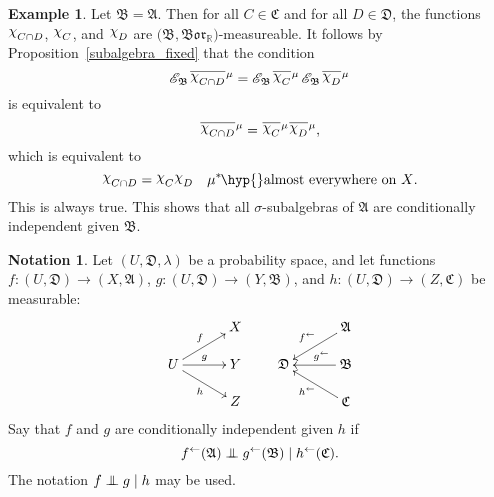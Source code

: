 \documentclass[
twoside=true,
paper=letter,
fontsize=9pt,
pagesize=auto,
leqno,
openany,
headsepline,
overfullrule,
]{scrbook}
\theoremstyle{plain}
\theoremstyle{plain}
\theoremstyle{definition}
\newtheorem{example}[thm]{Example}
\newtheorem{notn}[thm]{Notation}
\theoremstyle{bfnoteitalic}
\theoremstyle{bfnoteroman}
\newcommand{\sigalg}[1]{\mathfrak{#1}}
\newcommand{\cali}[1]{\mathscr{#1}}
\newcommand{\condexpsub}[2]
{\mathop{\cali{E}\hspace{-1.5pt}}\nolimits_{#2}\hspace{-1pt}#1}
\newcommand{\borel}{\mathfrak{Bor}}
\newcommand{\textsigma}{\hbox{\large{$\sigma$}}\kern-1pt}
\newcommand{\charfunction}[1]{{\raisebox{2pt}{$\chi$}}_{#1}}
\newcommand{\preimage}[1]{#1^{\leftarrow}}
\newcommand{\R}{\mathbb{R}}
\newcommand{\meets}{\cap}
\newcommand{\sigmaalgebra}{\sigalg{A}}
\newcommand{\sigmaalgebraii}{\sigalg{B}}
\newcommand{\sigmaalgebraiii}{\sigalg{C}}
\newcommand{\sigmaalgebraiv}{\sigalg{D}}
\newcommand{\kernast}{\ast\kern-1pt}
\newcommand{\function}{f}
\newcommand{\functionii}{g}
\newcommand{\functioniii}{h}
\newcommand{\measurespace}{X}
\newcommand{\measurespaceii}{Y}
\newcommand{\measurespaceiii}{Z}
\newcommand{\measure}{\mu}
\newcommand{\measureiii}{\lambda}
\newcommand{\setiii}{C}
\newcommand{\setiv}{D}
\newcommand{\uspace}{U}%
\newcommand{\uspacesig}{\sigalg{D}}
\newcommand{\condindep}[3]{#1\perp\kern-6pt\perp #2\mid #3}
\newcommand*\xbar[1]{%
   \hbox{%
     \vbox{%
       \hrule height 0.4pt %
       \kern0.4ex%
       \hbox{%
         \ensuremath{#1}%
       }%
     }%
   }%
}
\newcommand{\lebclass}[1]{\hspace{.5pt}\xbar{#1}\hspace{0.5pt}}
\newcommand{\ellclass}[2]{\lebclass{#1}^{#2}}
\begin{document}
\begin{example}
Let $\sigmaalgebraii = \sigmaalgebra$.
Then for all $\setiii\in\sigmaalgebraiii$ and for all $\setiv\in\sigmaalgebraiv$,
the functions
$\charfunction{\setiii\meets\setiv}$, $\charfunction{\setiii}$,
and $\charfunction{\setiv}$ are
$\bigl( \sigmaalgebraii, \borel_\R \bigr)$\hyp{}measureable.
It follows by Proposition~\ref{subalgebra_fixed} that the condition
\[
\condexpsub{\ellclass{\charfunction{\setiii\meets\setiv}}{\measure}}{\sigmaalgebraii}
=
\condexpsub{\ellclass{\charfunction{\setiii}}{\measure}}{\sigmaalgebraii}
\condexpsub{\ellclass{\charfunction{\setiv}}{\measure}}{\sigmaalgebraii}
\]
is equivalent to
\[
\ellclass{\charfunction{\setiii\meets\setiv}}{\measure}
=
\ellclass{\charfunction{\setiii}}{\measure}
\ellclass{\charfunction{\setiv}}{\measure},
\]
which is equivalent to
\[
\charfunction{\setiii\meets\setiv}
=
\charfunction{\setiii}
\charfunction{\setiv}
\quad\text{$\measure^\kernast$\hyp{}almost everywhere on $\measurespace$.}
\]
This is always true.
This shows that all \textsigma\hyp{}subalgebras of $\sigmaalgebra$ are conditionally independent given $\sigmaalgebraii$.
\end{example}


\begin{notn}\label{conditionally_independent_functions}
Let
$(\uspace,\uspacesig,\measureiii)$
be a probability space, and let functions
$\function:(\uspace,\uspacesig)\to (\measurespace,\sigmaalgebra)$,
$\functionii:(\uspace,\uspacesig)\to (\measurespaceii,\sigmaalgebraii)$,
and
$\functioniii:(\uspace,\uspacesig)\to (\measurespaceiii,\sigmaalgebraiii)$
be measurable:
\[
\xymatrix@R=14pt@C=30pt{
 & \measurespace \\
 \uspace
 \ar[ur]^\function
 \ar[r]^\functionii
 \ar[dr]_\functioniii
 & \measurespaceii\\
 & \measurespaceiii \\
}
%
\qquad
%
\xymatrix@R=14pt@C=30pt{
 & \sigmaalgebra \ar[dl]_{\preimage{\function}} \\
 \uspacesig & \sigmaalgebraii \ar[l]_-{\quad \preimage{\functionii}}\\
 & \sigmaalgebraiii \ar[ul]^{\preimage{\functioniii}}\\
}
\]
Say that $\function$ and $\functionii$ are conditionally independent
given $\functioniii$ if
\[
\condindep{\preimage{\function}(\sigmaalgebra)}{\preimage{\functionii}(\sigmaalgebraii)}
{\preimage{\functioniii}(\sigmaalgebraiii)}.
\]
The notation
$\condindep{\function}{\functionii}{\functioniii}$ may be used.
\end{notn}
\end{document}
